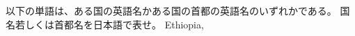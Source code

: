 \documentclass{jarticle}
\begin{document}
\vspace*{\fill}
\begin{center}
以下の単語は、ある国の英語名かある国の首都の英語名のいずれかである。
国名若しくは首都名を日本語で表せ。
Ethiopia,
\end{center}
\vspace*{\fill}
\end{document}
